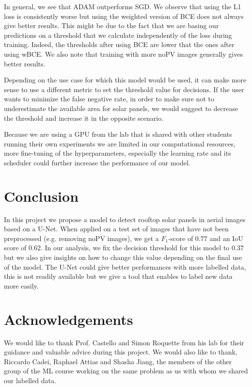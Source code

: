 \documentclass[10pt,conference]{IEEEtran}
\begin{document}
In general, we see that ADAM outperforms SGD.
We observe that using the L1 loss is consistently worse but using the weighted version of BCE does not always give better results. This might be due to the fact that we are basing our predictions on a threshold that we calculate independently of the loss during training. Indeed, the thresholds after using BCE are lower that the ones after using wBCE. 
We also note that training with more noPV images generally gives better results.

Depending on the use case for which this model would be used, it can make more sense to use a different metric to set the threshold value for decisions. If the user wants to minimize the false negative rate, in order to make sure not to underestimate the available area for solar panels, we would suggest to decrease the threshold and increase it in the opposite scenario.

Because we are using a GPU from the lab that is shared with other students running their own experiments we are limited in our computational resources, more fine-tuning of the hyperparameters, especially the learning rate and its scheduler could further increase the performance of our model.

\section{Conclusion}
In this project we propose a model to detect rooftop solar panels in aerial images based on a U-Net. When applied on a test set of images that have not been preprocessed (e.g. removing noPV images), we get a $F_1$-score of $0.77$ and an IoU score of 0.62. 
In our analysis, we fix the decision threshold for this model to $0.37$ but we also give insights on how to change this value depending on the final use of the model.
The U-Net could give better performances with more labelled data, this is not readily available but we give a tool that enables to label new data more easily.

\section*{Acknowledgements}
We would like to thank Prof. Castello and Simon Roquette from his lab for their guidance and valuable advice during this project. We would also like to thank, Riccardo Cadei, Raphael Attias and Shasha Jiang, the members of the other group of the ML course working on the same problem as us with whom we shared our labelled data.


\end{document}
